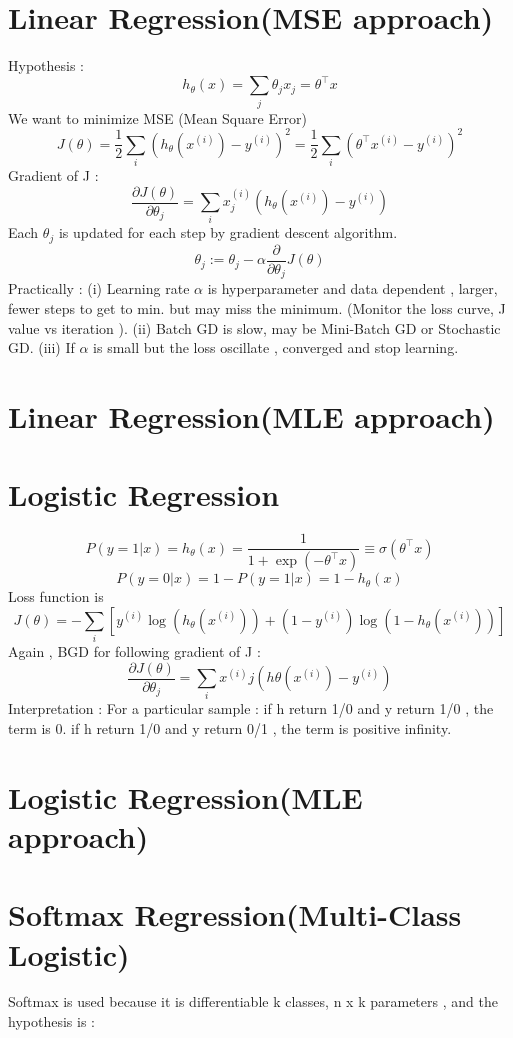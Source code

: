 \documentclass{article}
\begin{document}
\section{Linear Regression(MSE approach) }
Hypothesis : 
\[
h_\theta(x) = \sum_j \theta_j x_j = \theta^\top x
\]
We want to minimize MSE (Mean Square Error) 
\[
J(\theta) = \frac{1}{2} \sum_i \left( h_\theta(x^{(i)}) - y^{(i)} \right)^2 = \frac{1}{2} \sum_i \left( \theta^\top x^{(i)} - y^{(i)} \right)^2
\]
Gradient of J : 
\[
\frac{\partial J(\theta)}{\partial \theta_j} = \sum_i x_j^{(i)} \left( h_\theta(x^{(i)}) - y^{(i)} \right)
\]
Each \(\theta_j\) is updated for each step by gradient descent algorithm. 
\[
\theta_j := \theta_j - \alpha \frac{\partial}{\partial \theta_j} J(\theta)
\]
Practically : 
\newline
(i) Learning rate \(\alpha\) is hyperparameter and data dependent , larger, fewer steps to get to min. but may miss the minimum. (Monitor the loss curve, J value vs iteration ). 
\newline
(ii) Batch GD is slow, may be Mini-Batch GD or Stochastic GD.
\newline
(iii) If \(\alpha\) is small but the loss oscillate , converged and stop learning.


\section{Linear Regression(MLE approach) }
\section{Logistic Regression}
\[P(y=1|x) = h_\theta(x) = \frac{1}{1 + \exp(-\theta^\top x)} \equiv \sigma(\theta^\top x)\]
\[P(y=0|x) = 1 - P(y=1|x) = 1 - h_\theta(x)\]
Loss function is 
\[J(\theta) = -\sum_i \left[ y^{(i)} \log(h_\theta(x^{(i)})) + (1 - y^{(i)}) \log(1 - h_\theta(x^{(i)})) \right]\]
Again , BGD for following gradient of J : 
\[\frac{\partial J(\theta)}{\partial \theta_j} = \sum_i x^{(i)}j \left( h\theta(x^{(i)}) - y^{(i)} \right)\]
Interpretation : For a particular sample : if h return 1/0 and y return 1/0 , the term is 0. if  h return 1/0 and y return 0/1 , the term is positive infinity. 
\section{Logistic Regression(MLE approach)}
\section{Softmax Regression(Multi-Class Logistic)}
Softmax is used because it is differentiable 
k classes, n x k parameters , and the hypothesis is :
\end{document}
